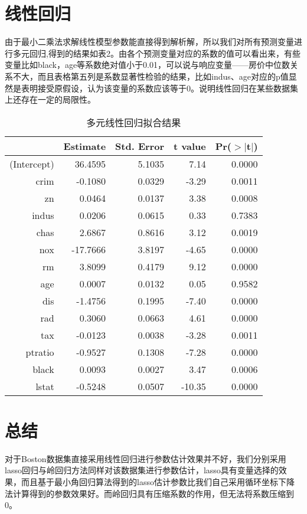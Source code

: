 \documentclass[cn]{elegantpaper}
\begin{document}
\section{线性回归}
由于最小二乘法求解线性模型参数能直接得到解析解，所以我们对所有预测变量进行多元回归,得到的结果如表2。由各个预测变量对应的系数的值可以看出来，有些变量比如black，age等系数绝对值小于0.01，可以说与响应变量——房价中位数关系不大，而且表格第五列是系数显著性检验的结果，比如indus、age对应的p值显然是表明接受原假设，认为该变量的系数应该等于0。说明线性回归在某些数据集上还存在一定的局限性。
\begin{table}[H]
    \centering
    \caption{多元线性回归拟合结果}
    \begin{tabular}{rrrrr}
      \hline
     & Estimate & Std. Error & t value & Pr($>$$|$t$|$) \\ 
      \hline
    (Intercept) & 36.4595 & 5.1035 & 7.14 & 0.0000 \\ 
      crim & -0.1080 & 0.0329 & -3.29 & 0.0011 \\ 
      zn & 0.0464 & 0.0137 & 3.38 & 0.0008 \\ 
      indus & 0.0206 & 0.0615 & 0.33 & 0.7383 \\ 
      chas & 2.6867 & 0.8616 & 3.12 & 0.0019 \\ 
      nox & -17.7666 & 3.8197 & -4.65 & 0.0000 \\ 
      rm & 3.8099 & 0.4179 & 9.12 & 0.0000 \\ 
      age & 0.0007 & 0.0132 & 0.05 & 0.9582 \\ 
      dis & -1.4756 & 0.1995 & -7.40 & 0.0000 \\ 
      rad & 0.3060 & 0.0663 & 4.61 & 0.0000 \\ 
      tax & -0.0123 & 0.0038 & -3.28 & 0.0011 \\ 
      ptratio & -0.9527 & 0.1308 & -7.28 & 0.0000 \\ 
      black & 0.0093 & 0.0027 & 3.47 & 0.0006 \\ 
      lstat & -0.5248 & 0.0507 & -10.35 & 0.0000 \\ 
       \hline
    \end{tabular}
\end{table}




\section{总结}
对于Boston数据集直接采用线性回归进行参数估计效果并不好，我们分别采用lasso回归与岭回归方法同样对该数据集进行参数估计，lasso具有变量选择的效果，而且基于最小角回归算法得到的lasso估计参数比我们自己采用循环坐标下降法计算得到的参数效果好。而岭回归具有压缩系数的作用，但无法将系数压缩到0。
\end{document}
